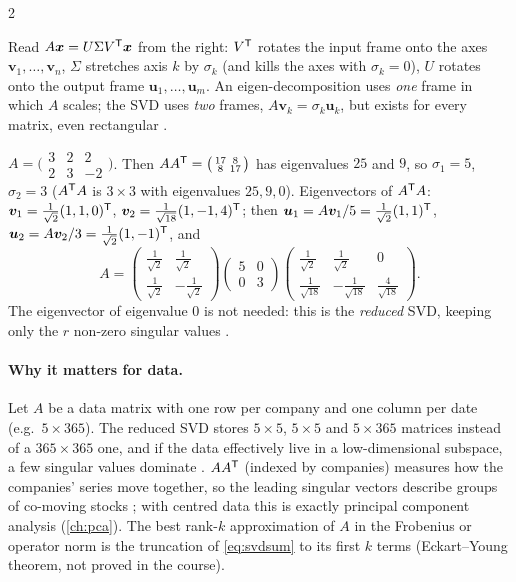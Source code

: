\begin{paracol}{2}
\begin{intuition}
Read $A\bm x=U\Sigma V^{\mathsf T}\bm x$ from the right: $V^{\mathsf T}$ rotates the input frame onto the axes
$\bm v_1,\dots,\bm v_n$, $\Sigma$ stretches axis $k$ by $\sigma_k$ (and kills the axes with $\sigma_k=0$), $U$
rotates onto the output frame $\bm u_1,\dots,\bm u_m$. An eigen-decomposition uses \emph{one} frame in which
$A$ scales; the SVD uses \emph{two} frames, $A\bm v_k=\sigma_k\bm u_k$, but exists for every matrix, even
rectangular .
\end{intuition}

\begin{example}
$A=\bigl(\begin{smallmatrix}3&2&2\\2&3&-2\end{smallmatrix}\bigr)$. Then $AA^{\mathsf T}=\bigl(\begin{smallmatrix}17&8\\8&17\end{smallmatrix}\bigr)$
has eigenvalues $25$ and $9$, so $\sigma_1=5$, $\sigma_2=3$ ($A^{\mathsf T} A$ is $3\times3$ with eigenvalues
$25,9,0$). Eigenvectors of $A^{\mathsf T} A$: $\bm v_1=\frac1{\sqrt2}(1,1,0)^{\mathsf T}$, $\bm v_2=\frac1{\sqrt{18}}(1,-1,4)^{\mathsf T}$;
then $\bm u_1=A\bm v_1/5=\frac1{\sqrt2}(1,1)^{\mathsf T}$, $\bm u_2=A\bm v_2/3=\frac1{\sqrt2}(1,-1)^{\mathsf T}$, and
\[
  A=\begin{pmatrix}\tfrac1{\sqrt2}&\tfrac1{\sqrt2}\\[2pt] \tfrac1{\sqrt2}&-\tfrac1{\sqrt2}\end{pmatrix}
    \begin{pmatrix}5&0\\0&3\end{pmatrix}
    \begin{pmatrix}\tfrac1{\sqrt2}&\tfrac1{\sqrt2}&0\\[2pt] \tfrac1{\sqrt{18}}&-\tfrac1{\sqrt{18}}&\tfrac4{\sqrt{18}}\end{pmatrix}.
\]
The eigenvector of eigenvalue $0$ is not needed: this is the \emph{reduced} SVD, keeping only the $r$
non-zero singular values .
\end{example}

\paragraph{Why it matters for data.} Let $A$ be a data matrix with one row per company and one column per
date (e.g.\ $5\times365$). The reduced SVD stores $5\times5$, $5\times5$ and $5\times365$ matrices instead of a
$365\times365$ one, and if the data effectively live in a low-dimensional subspace, a few singular values
dominate . $AA^{\mathsf T}$ (indexed by companies) measures how the companies' series move together,
so the leading singular vectors describe groups of co-moving stocks ; with centred data
this is exactly principal component analysis (\cref{ch:pca}). The best rank-$k$ approximation of $A$ in the
Frobenius or operator norm is the truncation of \eqref{eq:svdsum} to its first $k$ terms (Eckart--Young
theorem, not proved in the course).


\end{paracol}
